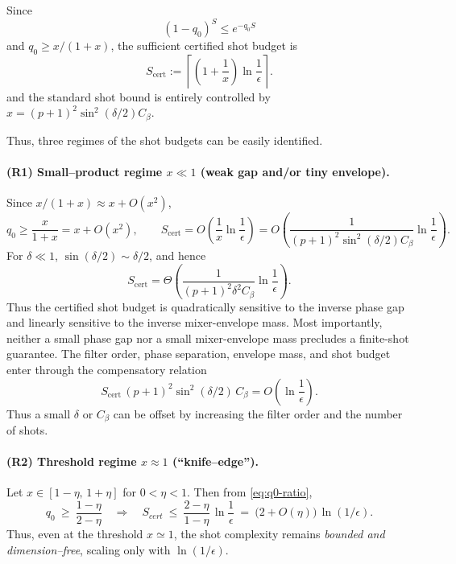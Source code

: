\documentclass[a4paper,unpublished,onecolumn,11pt]{quantumarticle}
\theoremstyle{definition}
\theoremstyle{remark}
\begin{document}
Since
\[
(1-q_0)^S\le e^{-q_0S}
\]
and $q_0\ge x/(1+x)$, the sufficient certified shot budget is
\begin{equation}
\label{eq:certified-shot-budget}
S_{\mathrm{cert}}
:=
\left\lceil
\left(1+\frac{1}{x}\right)
\ln\frac{1}{\epsilon}
\right\rceil.
\end{equation}
and the standard shot bound
is entirely controlled by \(x=(p{+}1)^2\sin^2(\delta/2)C_\beta\).

Thus, three regimes of the shot budgets can be easily identified.

\paragraph{(R1) Small–product regime \(x\ll 1\) (weak gap and/or tiny envelope).}
Since \( x/(1+x)\approx x + O(x^2)\),
\begin{equation}
\label{eq:regime-small}
q_0
\ge
\frac{x}{1+x}
=
x+O(x^2),
\qquad
S_{\mathrm{cert}}
=
O\!\left(
\frac{1}{x}\ln\frac{1}{\epsilon}
\right)
=
O\!\left(
\frac{1}{
(p+1)^2\sin^2(\delta/2)C_\beta
}
\ln\frac{1}{\epsilon}
\right).
\end{equation}
For $\delta\ll1$, $\sin(\delta/2)\sim\delta/2$, and hence
\[
S_{\mathrm{cert}}
=
\Theta\!\left(
\frac{1}{(p+1)^2\delta^2 C_\beta}
\ln\frac{1}{\epsilon}
\right).
\]
Thus the certified shot budget is quadratically sensitive to the inverse phase gap and linearly sensitive to the inverse mixer-envelope mass. Most importantly, neither a small phase gap nor a small
mixer-envelope mass precludes a finite-shot guarantee. The filter
order, phase separation, envelope mass, and shot budget enter through
the compensatory relation
\begin{equation}
\label{eq:finite-synth}
S_{\mathrm{cert}}\,
(p+1)^2\sin^2(\delta/2)\,C_\beta
=
O\!\left(\ln\frac{1}{\epsilon}\right).
\end{equation}
Thus a small $\delta$ or $C_\beta$ can be offset by increasing the filter order and the number of shots.

\paragraph{(R2) Threshold regime \(x\approx 1\) (``knife--edge'').}
Let \(x\in[1-\eta,\,1+\eta]\) for \(0<\eta<1\). Then from \eqref{eq:q0-ratio},
\begin{equation}
\label{eq:regime-threshold}
q_0\ \ge\ \frac{1-\eta}{2-\eta}
\quad\Longrightarrow\quad
S_{cert}\ \le\ \frac{2-\eta}{1-\eta}\,\ln\frac{1}{\epsilon}
\ =\ \bigl(2+O(\eta)\bigr)\,\ln(1/\epsilon).
\end{equation}
Thus, even at the threshold \(x\simeq 1\), the shot complexity remains \emph{bounded and
dimension–free}, scaling only with \(\ln(1/\epsilon)\).
\end{document}
